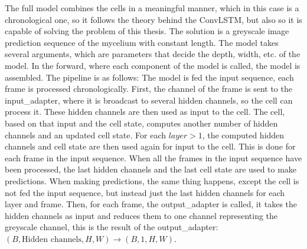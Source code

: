\documentclass[a4paper,12pt]{article}
\begin{document}
The full model combines the cells in a meaningful manner, which in this case is a chronological one, so it follows the theory behind the ConvLSTM, but also so it is capable of solving the problem of this thesis. The solution is a greyscale image prediction sequence of the mycelium with constant length.
The model takes several arguments, which are parameters that decide the depth, width, etc. of the model. In the forward, where each component of the model is called, the model is assembled. The pipeline is as follows:
The model is fed the input sequence, each frame is processed chronologically. First, the channel of the frame is sent to the input\_adapter, where it is broadcast to several hidden channels, so the cell can process it. These hidden channels are then used as input to the cell. The cell, based on that input and the cell state, computes another number of hidden channels and an updated cell state. For each $layer > 1$, the computed hidden channels and cell state are then used again for input to the cell. This is done for each frame in the input sequence.
When all the frames in the input sequence have been processed, the last hidden channels and the last cell state are used to make predictions. When making predictions, the same thing happens, except the cell is not fed the input sequence, but instead just the last hidden channels for each layer and frame. Then, for each frame, the output\_adapter is called, it takes the hidden channels as input and reduces them to one channel representing the greyscale channel, this is the result of the output\_adapter: $(B, \text{Hidden channels}, H, W) \rightarrow (B, 1, H, W)$.
\end{document}
